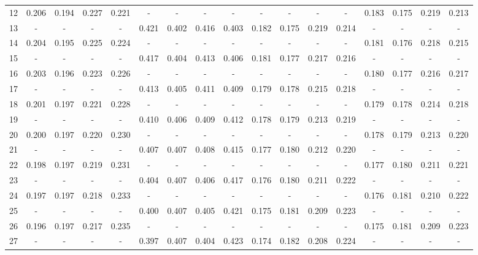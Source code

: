 \documentclass{report}
\begin{document}
\begin{table}
\begin{tabular}{|c|cccc|cccc|cccc|cccc|}
12 & 0.206 & 0.194 & 0.227 & 0.221 &   -   &   -   &   -   &   -   &   -   &   -   &   -   &   -   & 0.183 & 0.175 & 0.219 & 0.213\\
13 &   -   &   -   &   -   &   -   & 0.421 & 0.402 & 0.416 & 0.403 & 0.182 & 0.175 & 0.219 & 0.214 &   -   &   -   &   -   &   -  \\
14 & 0.204 & 0.195 & 0.225 & 0.224 &   -   &   -   &   -   &   -   &   -   &   -   &   -   &   -   & 0.181 & 0.176 & 0.218 & 0.215\\
15 &   -   &   -   &   -   &   -   & 0.417 & 0.404 & 0.413 & 0.406 & 0.181 & 0.177 & 0.217 & 0.216 &   -   &   -   &   -   &   -  \\
16 & 0.203 & 0.196 & 0.223 & 0.226 &   -   &   -   &   -   &   -   &   -   &   -   &   -   &   -   & 0.180 & 0.177 & 0.216 & 0.217\\
17 &   -   &   -   &   -   &   -   & 0.413 & 0.405 & 0.411 & 0.409 & 0.179 & 0.178 & 0.215 & 0.218 &   -   &   -   &   -   &   -  \\
18 & 0.201 & 0.197 & 0.221 & 0.228 &   -   &   -   &   -   &   -   &   -   &   -   &   -   &   -   & 0.179 & 0.178 & 0.214 & 0.218\\
19 &   -   &   -   &   -   &   -   & 0.410 & 0.406 & 0.409 & 0.412 & 0.178 & 0.179 & 0.213 & 0.219 &   -   &   -   &   -   &   -  \\
20 & 0.200 & 0.197 & 0.220 & 0.230 &   -   &   -   &   -   &   -   &   -   &   -   &   -   &   -   & 0.178 & 0.179 & 0.213 & 0.220\\
21 &   -   &   -   &   -   &   -   & 0.407 & 0.407 & 0.408 & 0.415 & 0.177 & 0.180 & 0.212 & 0.220 &   -   &   -   &   -   &   -  \\
22 & 0.198 & 0.197 & 0.219 & 0.231 &   -   &   -   &   -   &   -   &   -   &   -   &   -   &   -   & 0.177 & 0.180 & 0.211 & 0.221\\
23 &   -   &   -   &   -   &   -   & 0.404 & 0.407 & 0.406 & 0.417 & 0.176 & 0.180 & 0.211 & 0.222 &   -   &   -   &   -   &   -  \\
24 & 0.197 & 0.197 & 0.218 & 0.233 &   -   &   -   &   -   &   -   &   -   &   -   &   -   &   -   & 0.176 & 0.181 & 0.210 & 0.222\\
25 &   -   &   -   &   -   &   -   & 0.400 & 0.407 & 0.405 & 0.421 & 0.175 & 0.181 & 0.209 & 0.223 &   -   &   -   &   -   &   -  \\
26 & 0.196 & 0.197 & 0.217 & 0.235 &   -   &   -   &   -   &   -   &   -   &   -   &   -   &   -   & 0.175 & 0.181 & 0.209 & 0.223\\
27 &   -   &   -   &   -   &   -   & 0.397 & 0.407 & 0.404 & 0.423 & 0.174 & 0.182 & 0.208 & 0.224 &   -   &   -   &   -   &   -  \\

\end{tabular}
\end{table}
\end{document}
